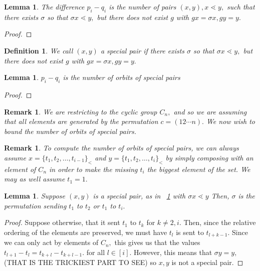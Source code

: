 \documentclass{amsart}
\newtheorem{lem}[subsubsection]{Lemma}
\newtheorem{defn}[subsubsection]{Definition}
\newtheorem{rem}[subsubsection]{Remark}
\begin{document}
\begin{lem}
The difference $p_i - q_i$ is the number of pairs $(x,y),x \lessdot y,$ such that there exists $\sigma$ so that $\sigma x \lessdot y,$ but there does not exist $g$ with $gx =\sigma x,gy = y.$ 
\end{lem}
\begin{proof}

\end{proof}

\begin{defn}
We call $(x,y)$ a special pair if there exists $\sigma$ so that $\sigma x \lessdot y,$ but there does not exist $g$ with $gx =\sigma x,gy = y.$
\end{defn}

\begin{lem}
$p_i - q_i$ is the number of orbits of special pairs
\end{lem}
\begin{proof}

\end{proof}

\begin{rem}
We are restricting to the cyclic group $C_n,$ and so we are assuming that all elements are generated by the permutation $c =(1 2 \cdots n).$ We now wish to bound the number of orbits of special pairs.
\end{rem}

\begin{rem}
\label{proper_ordering}
To compute the number of orbits of special pairs, we can always assume $x = \{t_1,t_2,\ldots, t_{i-1}\}_<$ and $y = \{t_1,t_2,\ldots, t_i\}_<$ by simply composing with an element of $C_n$ in order to make the missing $t_i$ the biggest element of the set. We may as well assume $t_1 = 1.$
\end{rem}



\begin{lem}
\label{max_shift_one}
Suppose $(x,y)$ is a special pair, as in ~\ref{proper_ordering} with $\sigma x \lessdot y$ Then, $\sigma$ is the permutation sending $t_1$ to $t_2$ or $t_1$ to $t_{i}.$
\end{lem}
\begin{proof}
Suppose otherwise, that it sent $t_1$ to $t_k$ for $k \neq 2,i.$ Then, since the relative ordering of the elements are preserved, we must have $t_l$ is sent to $t_{l+k-1}.$ Since we can only act by elements of $C_n,$ this gives us that the values $t_{l+1}-t_l= t_{k+l}-t_{k+l-1}.$ for all $l \in [i].$ However, this means that $\sigma y = y,$ (THAT IS THE TRICKIEST PART TO SEE) so $x,y$ is not a special pair.
\end{proof}
\end{document}
